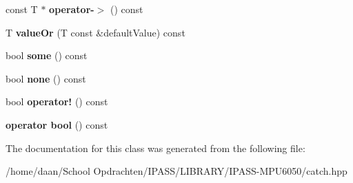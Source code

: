 \begin{DoxyCompactItemize}
\mbox{\label{classCatch_1_1Option_ae8343cbc36dbb95b2dce333d2a6fdc28}} 
const T $\ast$ {\bfseries operator-\/$>$} () const
\item 
\mbox{\label{classCatch_1_1Option_a8d9ae2e30b0eb76fe134a6fbc8423124}} 
T {\bfseries value\+Or} (T const \&default\+Value) const
\item 
\mbox{\label{classCatch_1_1Option_a97c95829afbe92f2bcc5fd75b32c0825}} 
bool {\bfseries some} () const
\item 
\mbox{\label{classCatch_1_1Option_a821753afdc3fac947a13a01fbe0d248e}} 
bool {\bfseries none} () const
\item 
\mbox{\label{classCatch_1_1Option_a96dccb86bdf45ee0c08e122b6133bef3}} 
bool {\bfseries operator!} () const
\item 
\mbox{\label{classCatch_1_1Option_aba0def0bd9cd45d4e00fe47a604b0270}} 
{\bfseries operator bool} () const
\end{DoxyCompactItemize}


The documentation for this class was generated from the following file\+:\begin{DoxyCompactItemize}
\item 
/home/daan/\+School Opdrachten/\+I\+P\+A\+S\+S/\+L\+I\+B\+R\+A\+R\+Y/\+I\+P\+A\+S\+S-\/\+M\+P\+U6050/catch.\+hpp\end{DoxyCompactItemize}
